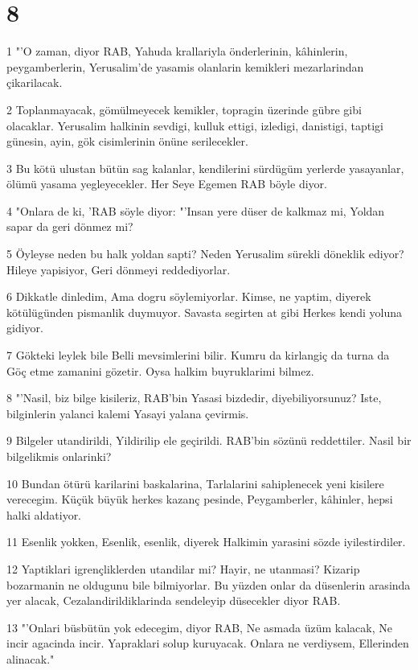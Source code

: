 \chapter{8}

\par 1 "'O zaman, diyor RAB, Yahuda krallariyla önderlerinin, kâhinlerin, peygamberlerin, Yerusalim'de yasamis olanlarin kemikleri mezarlarindan çikarilacak.
\par 2 Toplanmayacak, gömülmeyecek kemikler, topragin üzerinde gübre gibi olacaklar. Yerusalim halkinin sevdigi, kulluk ettigi, izledigi, danistigi, taptigi günesin, ayin, gök cisimlerinin önüne serilecekler.
\par 3 Bu kötü ulustan bütün sag kalanlar, kendilerini sürdügüm yerlerde yasayanlar, ölümü yasama yegleyecekler. Her Seye Egemen RAB böyle diyor.
\par 4 "Onlara de ki, 'RAB söyle diyor: "'Insan yere düser de kalkmaz mi, Yoldan sapar da geri dönmez mi?
\par 5 Öyleyse neden bu halk yoldan sapti? Neden Yerusalim sürekli döneklik ediyor? Hileye yapisiyor, Geri dönmeyi reddediyorlar.
\par 6 Dikkatle dinledim, Ama dogru söylemiyorlar. Kimse, ne yaptim, diyerek kötülügünden pismanlik duymuyor. Savasta segirten at gibi Herkes kendi yoluna gidiyor.
\par 7 Gökteki leylek bile Belli mevsimlerini bilir. Kumru da kirlangiç da turna da Göç etme zamanini gözetir. Oysa halkim buyruklarimi bilmez.
\par 8 "'Nasil, biz bilge kisileriz, RAB'bin Yasasi bizdedir, diyebiliyorsunuz? Iste, bilginlerin yalanci kalemi Yasayi yalana çevirmis.
\par 9 Bilgeler utandirildi, Yildirilip ele geçirildi. RAB'bin sözünü reddettiler. Nasil bir bilgelikmis onlarinki?
\par 10 Bundan ötürü karilarini baskalarina, Tarlalarini sahiplenecek yeni kisilere verecegim. Küçük büyük herkes kazanç pesinde, Peygamberler, kâhinler, hepsi halki aldatiyor.
\par 11 Esenlik yokken, Esenlik, esenlik, diyerek Halkimin yarasini sözde iyilestirdiler.
\par 12 Yaptiklari igrençliklerden utandilar mi? Hayir, ne utanmasi? Kizarip bozarmanin ne oldugunu bile bilmiyorlar. Bu yüzden onlar da düsenlerin arasinda yer alacak, Cezalandirildiklarinda sendeleyip düsecekler diyor RAB.
\par 13 "'Onlari büsbütün yok edecegim, diyor RAB, Ne asmada üzüm kalacak, Ne incir agacinda incir. Yapraklari solup kuruyacak. Onlara ne verdiysem, Ellerinden alinacak."
